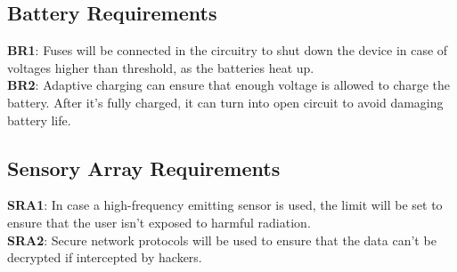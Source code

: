 \documentclass{article}
\begin{document}
\subsection{Battery Requirements}
\textbf{BR1}: Fuses will be connected in the circuitry to shut down the device in case of voltages higher than threshold, as the batteries heat up.
\\
\textbf{BR2}: Adaptive charging can ensure that enough voltage is allowed to charge the battery. After it's fully charged, it can turn into open circuit to avoid damaging battery life.

\subsection{Sensory Array Requirements}
\textbf{SRA1}: In case a high-frequency emitting sensor is used, the limit will be set to ensure that the user isn't exposed to harmful radiation.
\\
\textbf{SRA2}: Secure network protocols will be used to ensure that the data can't be decrypted if intercepted by hackers.
\end{document}
